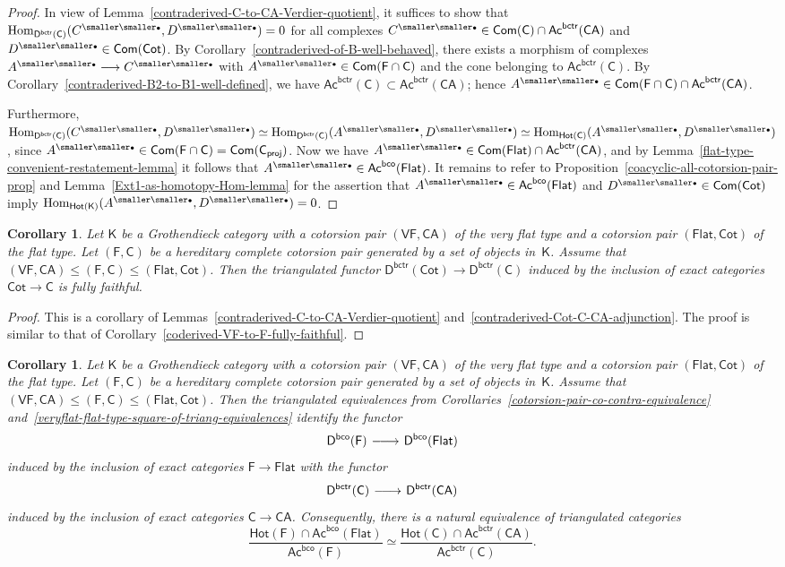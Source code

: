 \documentclass[12pt,a4paper]{amsart}
\newcommand{\+}{\nobreakdash-}
\renewcommand{\:}{\colon}
\newcommand{\rarrow}{\longrightarrow}
\newcommand{\bu}{{\text{\smaller\smaller$\scriptstyle\bullet$}}}
\newcommand{\lrarrow}{\mskip.5\thinmuskip\relbar\joinrel\relbar\joinrel
 \rightarrow\mskip.5\thinmuskip\relax}
\DeclareMathOperator{\Hom}{Hom}
\newcommand{\sC}{\mathsf C}
\newcommand{\sD}{\mathsf D}
\newcommand{\sF}{\mathsf F}
\newcommand{\sK}{\mathsf K}
\newcommand{\VF}{\mathsf{VF}}
\newcommand{\CA}{\mathsf{CA}}
\newcommand{\Flat}{\mathsf{Flat}}
\newcommand{\Cot}{\mathsf{Cot}}
\newcommand{\Hot}{\mathsf{Hot}}
\newcommand{\Com}{\mathsf{Com}}
\newcommand{\Ac}{\mathsf{Ac}}
\newcommand{\proj}{\mathsf{proj}}
\newcommand{\bco}{\mathsf{bco}}
\newcommand{\bctr}{\mathsf{bctr}}
\theoremstyle{plain}
\newtheorem{cor}[thm]{Corollary}
\theoremstyle{definition}
\begin{document}
\begin{proof}
 In view of Lemma~\ref{contraderived-C-to-CA-Verdier-quotient},
it suffices to show that $\Hom_{\sD^\bctr(\sC)}(C^\bu,D^\bu)=0$
for all complexes $C^\bu\in\Com(\sC)\cap\Ac^\bctr(\CA)$ and
$D^\bu\in\Com(\Cot)$.
 By Corollary~\ref{contraderived-of-B-well-behaved}, there exists
a morphism of complexes $A^\bu\rarrow C^\bu$ with
$A^\bu\in\Com(\sF\cap\sC)$ and the cone belonging to $\Ac^\bctr(\sC)$.
 By Corollary~\ref{contraderived-B2-to-B1-well-defined}, we have
$\Ac^\bctr(\sC)\subset\Ac^\bctr(\CA)$; hence
$A^\bu\in\Com(\sF\cap\sC)\cap\Ac^\bctr(\CA)$.

 Furthermore, $\Hom_{\sD^\bctr(\sC)}(C^\bu,D^\bu)\simeq
\Hom_{\sD^\bctr(\sC)}(A^\bu,D^\bu)\simeq\Hom_{\Hot(\sC)}(A^\bu,D^\bu)$,
since $A^\bu\in\Com(\sF\cap\sC)=\Com(\sC_\proj)$.
 Now we have $A^\bu\in\Com(\Flat)\cap\Ac^\bctr(\CA)$, and
by Lemma~\ref{flat-type-convenient-restatement-lemma} it follows that
$A^\bu\in\Ac^\bco(\Flat)$.
 It remains to refer to
Proposition~\ref{coacyclic-all-cotorsion-pair-prop}
and Lemma~\ref{Ext1-as-homotopy-Hom-lemma} for the assertion that
$A^\bu\in\Ac^\bco(\Flat)$ and $D^\bu\in\Com(\Cot)$ imply
$\Hom_{\Hot(\sK)}(A^\bu,D^\bu)=0$.
\end{proof}

\begin{cor} \label{contraderived-Cot-to-C-fully-faithful}
 Let\/ $\sK$ be a Grothendieck category with a cotorsion pair
$(\VF,\CA)$ of the very flat type and a cotorsion pair $(\Flat,\Cot)$
of the flat type.
 Let $(\sF,\sC)$ be a hereditary complete cotorsion pair generated by
a set of objects in\/~$\sK$.
 Assume that $(\VF,\CA)\le(\sF,\sC)\le(\Flat,\Cot)$.
 Then the triangulated functor\/ $\sD^\bctr(\Cot)\rarrow\sD^\bctr(\sC)$
induced by the inclusion of exact categories\/ $\Cot\rarrow\sC$ is
fully faithful.
\end{cor}

\begin{proof}
 This is a corollary of
Lemmas~\ref{contraderived-C-to-CA-Verdier-quotient}
and~\ref{contraderived-Cot-C-CA-adjunction}.
 The proof is similar to that of
Corollary~\ref{coderived-VF-to-F-fully-faithful}.
\end{proof}

\begin{cor} \label{F-to-Flat-isomorphic-to-C-to-CA-cor}
 Let\/ $\sK$ be a Grothendieck category with a cotorsion pair
$(\VF,\CA)$ of the very flat type and a cotorsion pair $(\Flat,\Cot)$
of the flat type.
 Let $(\sF,\sC)$ be a hereditary complete cotorsion pair generated by
a set of objects in\/~$\sK$.
 Assume that $(\VF,\CA)\le(\sF,\sC)\le(\Flat,\Cot)$.
 Then the triangulated equivalences from
Corollaries~\ref{cotorsion-pair-co-contra-equivalence}
and~\ref{veryflat-flat-type-square-of-triang-equivalences}
identify the functor
$$
 \sD^\bco(\sF)\lrarrow\sD^\bco(\Flat)
$$
induced by the inclusion of exact categories\/ $\sF\rarrow\Flat$
with the functor
$$
 \sD^\bctr(\sC)\lrarrow\sD^\bctr(\CA)
$$
induced by the inclusion of exact categories\/ $\sC\rarrow\CA$.
 Consequently, there is a natural equivalence of triangulated
categories
$$
 \frac{\Hot(\sF)\cap\Ac^\bco(\Flat)}{\Ac^\bco(\sF)}\simeq
 \frac{\Hot(\sC)\cap\Ac^\bctr(\CA)}{\Ac^\bctr(\sC)}.
$$
\end{cor}
\end{document}
